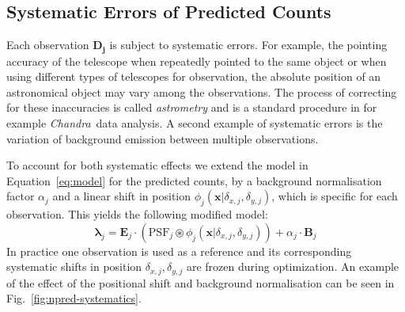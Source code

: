 \documentclass[twocolumn]{aastex631}
\newcommand{\chandra}{\textit{Chandra}~}
\begin{document}




    \subsection{Systematic Errors of Predicted Counts}
    Each observation $\mathbf{D_j}$ is subject to systematic errors. For example, the pointing accuracy of the telescope when repeatedly pointed to the same object or when using different types of telescopes for observation, the absolute position of an astronomical object may vary among the  observations. The process of correcting for these inaccuracies is called \textit{astrometry} and is a standard procedure in for example \chandra data analysis. A second example of systematic errors is the variation of background emission between multiple observations.
    
    To account for both systematic effects we extend the model in Equation~\ref{eq:model} for the predicted counts, by a background normalisation factor $\alpha_j$ and a linear shift in position $\phi_j(\mathbf{x}| \delta_{x,j}, \delta_{y,j})$, which is specific for each observation. This yields the following modified model:
    \begin{equation}
        \label{eq:model-npred-calibration}
        \mathbf{\lambda}_j = \mathbf{E}_j \cdot  \left(\mathrm{PSF}_j \circledast \phi_j(\mathbf{x}| \delta_{x,j}, \delta_{y,j})\right) + \alpha_j \cdot \mathbf{B}_j
    \end{equation}
    In practice one observation is used as a reference and its corresponding systematic shifts in position $\delta_{x,j}, \delta_{y,j}$ are frozen during optimization. An example of the effect of the positional shift and background normalisation can be seen in Fig.~\ref{fig:npred-systematics}.
\end{document}
